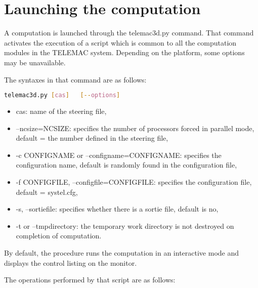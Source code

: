 \chapter{Launching the computation}

A computation is launched through the telemac3d.py command. That command
activates the execution of a script which is common to all the computation
modules in the TELEMAC system. Depending on the platform, some options may be
unavailable.

The syntaxes in that command are as follows:

\begin{lstlisting}[language=bash]
telemac3d.py [cas]   [--options]
\end{lstlisting}

\begin{itemize}
\item cas: name of the steering file,

\item --ncsize=NCSIZE: specifies the number of processors forced in parallel
mode, default = the number defined in the steering file,

\item -c CONFIGNAME or --configname=CONFIGNAME: specifies the configuration
name, default is randomly found in the configuration file,

\item -f CONFIGFILE, --configfile=CONFIGFILE: specifies the configuration
file, default = systel.cfg,

\item -s, --sortiefile: specifies whether there is a sortie file, default is
no,

\item -t or --tmpdirectory: the temporary work directory is not destroyed on
completion of computation.
\end{itemize}

By default, the procedure runs the computation in an interactive mode and
displays the control listing on the monitor.

The operations performed by that script are as follows:

